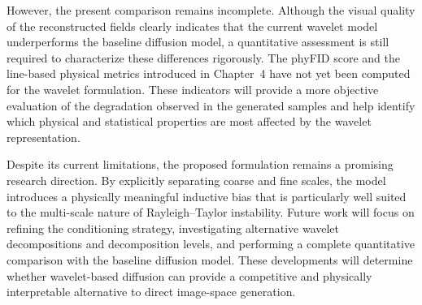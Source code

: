 However, the present comparison remains incomplete. Although the visual quality
of the reconstructed fields clearly indicates that the current wavelet model
underperforms the baseline diffusion model, a quantitative assessment is still
required to characterize these differences rigorously. The phyFID score and the
line-based physical metrics introduced in Chapter~4 have not yet been computed
for the wavelet formulation. These indicators will provide a more objective
evaluation of the degradation observed in the generated samples and help
identify which physical and statistical properties are most affected by the
wavelet representation.

Despite its current limitations, the proposed formulation remains a promising
research direction. By explicitly separating coarse and fine scales, the model
introduces a physically meaningful inductive bias that is particularly well
suited to the multi-scale nature of Rayleigh--Taylor instability. Future work
will focus on refining the conditioning strategy, investigating alternative
wavelet decompositions and decomposition levels, and performing a complete
quantitative comparison with the baseline diffusion model. These developments
will determine whether wavelet-based diffusion can provide a competitive and
physically interpretable alternative to direct image-space generation.

